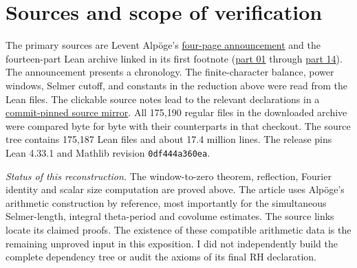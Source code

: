\documentclass[11pt,a4paper]{article}
\theoremstyle{definition}\newtheorem{arithinput}[theorem]{Arithmetic input}
\begin{document}
\section{Sources and scope of verification}\label{sec:sources}
The primary sources are Levent Alpöge's \href{https://alpo.ge/remark.pdf}{four-page announcement} and the fourteen-part Lean archive linked in its first footnote (\href{https://alpo.ge/lean.tar.gz.part01}{part 01} through \href{https://alpo.ge/lean.tar.gz.part14}{part 14}). The announcement presents a chronology. The finite-character balance, power windows, Selmer cutoff, and constants in the reduction above were read from the Lean files. The clickable source notes lead to the relevant declarations in a \href{https://github.com/TomasOrtega/RH/tree/a6ac91a412dcbaab31801355ec5707024a71bf65/extracted/lean}{commit-pinned source mirror}. All 175,190 regular files in the downloaded archive were compared byte for byte with their counterparts in that checkout. The source tree contains 175,187 Lean files and about 17.4 million lines. The release pins Lean 4.33.1 and Mathlib revision \texttt{0df444a360ea}.

\noindent\textit{Status of this reconstruction.}
The window-to-zero theorem, reflection, Fourier identity and scalar size computation are proved above. The article uses Alpöge's arithmetic construction by reference, most importantly for the simultaneous Selmer-length, integral theta-period and covolume estimates. The source links locate its claimed proofs. The existence of these compatible arithmetic data is the remaining unproved input in this exposition. I did not independently build the complete dependency tree or audit the axioms of its final RH declaration.
\end{document}
